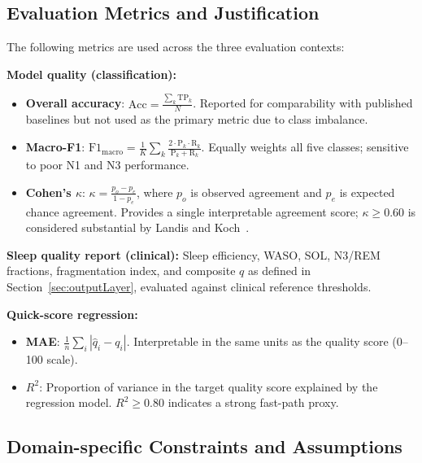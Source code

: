 \documentclass[10pt]{article}
\begin{document}
\subsection{Evaluation Metrics and Justification}
\label{sec:metricsEval}

The following metrics are used across the three evaluation contexts:

\textbf{Model quality (classification):}
\begin{itemize}
  \item \textbf{Overall accuracy}: $\text{Acc} = \frac{\sum_k \text{TP}_k}{N}$. Reported for comparability with published baselines but not used as the primary metric due to class imbalance.
  \item \textbf{Macro-F1}: $\text{F1}_{\text{macro}} = \frac{1}{K} \sum_k \frac{2 \cdot \text{P}_k \cdot \text{R}_k}{\text{P}_k + \text{R}_k}$. Equally weights all five classes; sensitive to poor N1 and N3 performance.
  \item \textbf{Cohen's $\kappa$}: $\kappa = \frac{p_o - p_e}{1 - p_e}$, where $p_o$ is observed agreement and $p_e$ is expected chance agreement. Provides a single interpretable agreement score; $\kappa \geq 0.60$ is considered substantial by Landis and Koch~\cite{landis1977measurement}.
\end{itemize}

\textbf{Sleep quality report (clinical):} Sleep efficiency, WASO, SOL, N3/REM fractions, fragmentation index, and composite $q$ as defined in Section~\ref{sec:outputLayer}, evaluated against clinical reference thresholds.

\textbf{Quick-score regression:}
\begin{itemize}
  \item \textbf{MAE}: $\frac{1}{n}\sum_i |\hat{q}_i - q_i|$. Interpretable in the same units as the quality score (0--100 scale).
  \item \textbf{$R^2$}: Proportion of variance in the target quality score explained by the regression model. $R^2 \geq 0.80$ indicates a strong fast-path proxy.
\end{itemize}

\subsection{Domain-specific Constraints and Assumptions}
\label{sec:constraints}
\end{document}
